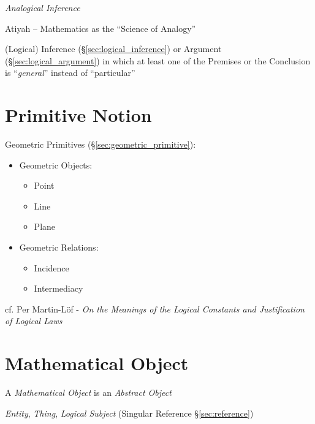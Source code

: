 \emph{Analogical Inference}

Atiyah -- Mathematics as the ``Science of Analogy''

(Logical) Inference (\S\ref{sec:logical_inference}) or Argument
(\S\ref{sec:logical_argument}) in which at least one of the Premises or the
Conclusion is ``\emph{general}'' instead of ``particular''



\section{Primitive Notion}\label{sec:primitive_notion}

Geometric Primitives (\S\ref{sec:geometric_primitive}):
\begin{itemize}
  \item Geometric Objects:
    \begin{itemize}
      \item Point
      \item Line
      \item Plane
    \end{itemize}
  \item Geometric Relations:
    \begin{itemize}
      \item Incidence
      \item Intermediacy
    \end{itemize}
\end{itemize}

cf. Per Martin-L\"of - \emph{On the Meanings of the Logical Constants and
  Justification of Logical Laws}



\section{Mathematical Object}\label{sec:mathematical_object}
\cite{laycock10}

A \emph{Mathematical Object} is an \emph{Abstract Object}

\emph{Entity}, \emph{Thing}, \emph{Logical Subject} (Singular
Reference \S\ref{sec:reference})

